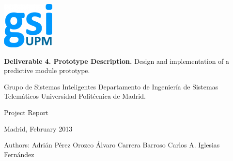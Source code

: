 \begin{titlepage}
\sffamily
\begin{flushright}

\rightskip=-1cm

\includegraphics[scale=1]{./img/logoGSI.png} 

\bigskip
\bigskip
\bigskip



\LARGE{\textbf{Deliverable 4. Prototype Description.}}
\linebreak
\large{Design and implementation of a predictive module prototype.}

\bigskip

\LARGE{Grupo de Sistemas Inteligentes}
\linebreak
\large{Departamento de Ingeniería de Sistemas Telemáticos}
\linebreak
\large{Universidad Politécnica de Madrid.}

\bigskip
\bigskip
\bigskip
\bigskip
\bigskip
\bigskip

\large{Project Report}

\bigskip

\normalsize{Madrid, February 2013}

\bigskip
\bigskip
\bigskip
\bigskip
\bigskip
\bigskip
\bigskip
\bigskip
\bigskip
\bigskip
\bigskip
\bigskip
\bigskip
\bigskip
\bigskip
\bigskip

\normalsize{Authors:}
\linebreak
\large{Adrián Pérez Orozco}
\linebreak
\large{Álvaro Carrera Barroso}
\linebreak
\large{Carlos A. Iglesias Fernández}

\end{flushright}
\end{titlepage}
